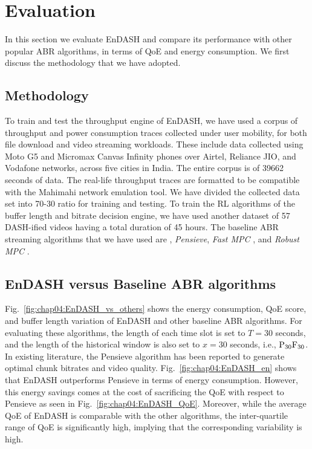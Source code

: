 \section{\textbf{Evaluation}}\label{sec:chap04:evaluation}

In this section we evaluate EnDASH and compare its performance with other popular \ac{ABR} algorithms, in terms of \ac{QoE} and energy consumption. We first discuss the methodology that we have adopted.
\subsection{Methodology}
To train and test the throughput engine of EnDASH, we have used a corpus of throughput and power consumption traces collected under user mobility, for both file download and video streaming workloads. These include data collected using Moto G5 and Micromax Canvas Infinity phones over Airtel, Reliance JIO, and Vodafone networks, across five cities in India. The entire corpus is of 39662 seconds of data. The real-life throughput traces are formatted to be compatible with the Mahimahi \cite{Netravali2015} network emulation tool. We have divided the collected data set into 70-30 ratio for training and testing. To train the RL algorithms of the buffer length and bitrate decision engine, we have used another  dataset of 57 DASH-ified videos having a total duration of 45 hours. 
The baseline \ac{ABR} streaming algorithms that we have used are  \cite{Spiteri2016}, \textit{Pensieve}\cite{mao2017neural}, \textit{Fast MPC} \cite{MPC-SIGCOMM-2015}, and \textit{Robust MPC} \cite{MPC-SIGCOMM-2015}.

\subsection{EnDASH versus Baseline ABR algorithms}
Fig.~\ref{fig:chap04:EnDASH_vs_others} shows the energy consumption, \ac{QoE} score, and buffer length variation of EnDASH and other baseline \ac{ABR} algorithms. For evaluating these algorithms, the length of each time slot is set to $T=30$ seconds, and the length of the historical window is also set to $x=30$ seconds, i.e., $\mathrm{P_{30}F_{30}}$. %
In existing literature, the Pensieve \cite{mao2017neural} algorithm has been reported to generate optimal chunk bitrates and video quality. Fig.~\ref{fig:chap04:EnDASH_en} shows that EnDASH outperforms Pensieve in terms of energy consumption. However, this energy savings comes at the cost of sacrificing the \ac{QoE} with respect to Pensieve as seen in Fig.~\ref{fig:chap04:EnDASH_QoE}. Moreover, while the average QoE of EnDASH is comparable with the other algorithms, the inter-quartile range of \ac{QoE} is significantly high, implying that the corresponding variability is high.  
